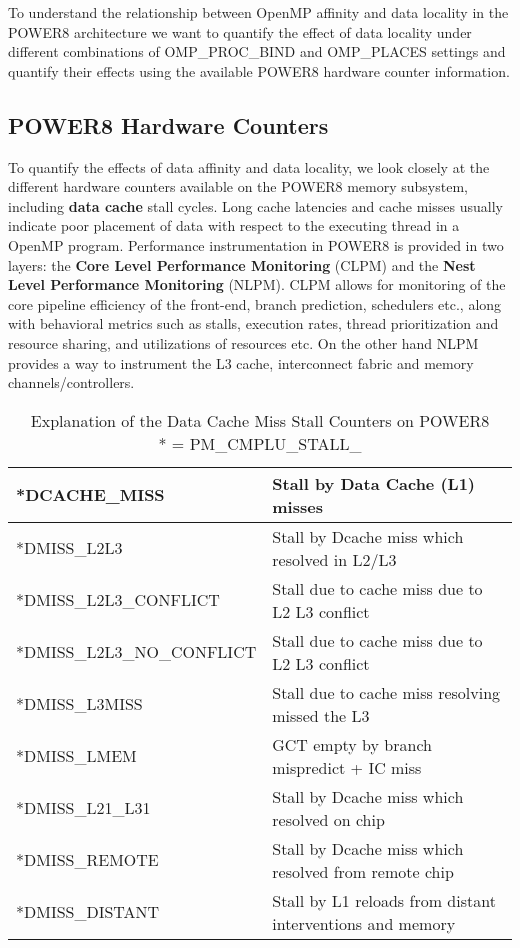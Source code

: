 To understand the relationship between OpenMP affinity and data locality in the POWER8 architecture we want to quantify the effect of data locality under different combinations of OMP\_PROC\_BIND and OMP\_PLACES settings and quantify their effects using the available POWER8 hardware counter information.

\subsection{POWER8 Hardware Counters}
To quantify the effects of data affinity and data locality, we look closely at the different hardware counters available on the POWER8 memory subsystem, including \textbf{data cache} stall cycles. Long cache latencies and cache misses usually indicate poor placement of data with respect to the executing thread in a OpenMP program. Performance instrumentation in POWER8 is provided in two layers: the \textbf{Core Level Performance Monitoring} (CLPM) and the \textbf{Nest Level Performance Monitoring} (NLPM). CLPM allows for monitoring of the core pipeline efficiency of the front-end, branch prediction, schedulers etc., along with behavioral metrics such as stalls, execution rates, thread prioritization and resource sharing, and utilizations of resources etc. On the other hand NLPM provides a way to instrument the L3 cache, interconnect fabric and memory channels/controllers. 
%
\begin{table*}[h]
\vspace{-0.5pc}
\centering
\begin{tabular} { | l | l |}
\hline
*DCACHE\_MISS & Stall by Data Cache (L1) misses\\  \hline
*DMISS\_L2L3 & Stall by Dcache miss which resolved in L2/L3 \\  \hline
*DMISS\_L2L3\_CONFLICT & Stall due to cache miss due to L2 L3 conflict \\  \hline
*DMISS\_L2L3\_NO\_CONFLICT & Stall due to cache miss due to L2 L3 conflict \\ \hline
*DMISS\_L3MISS & Stall due to cache miss resolving missed the L3 \\ \hline
*DMISS\_LMEM & GCT empty by branch mispredict + IC miss\\ \hline
*DMISS\_L21\_L31 &  Stall by Dcache miss which resolved on chip \\ \hline%
*DMISS\_REMOTE  & Stall by Dcache miss which resolved from remote chip \\ \hline%
*DMISS\_DISTANT & Stall by L1 reloads from distant interventions and memory \\ \hline
 \end{tabular}
 \caption{Explanation of the Data Cache Miss Stall Counters on POWER8 \\ * = PM\_CMPLU\_STALL\_}
\label{tab:hwct}
\end{table*}
